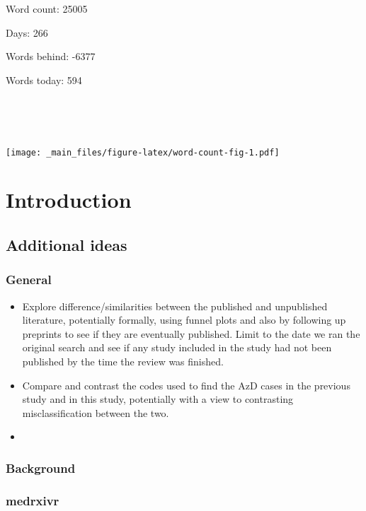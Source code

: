 \documentclass[a4paper, twoside]{templates/ociamthesis}
\begin{document}
\adjustmtc

Word count: 25005

Days: 266

Words behind: -6377

Words today: 594

~

~

\texttt{[image: \_main\_files/figure-latex/word-count-fig-1.pdf]}



\hypertarget{intro-heading}{%
\chapter{Introduction}\label{intro-heading}}

\minitoc 

\hypertarget{additional-ideas}{%
\section{Additional ideas}\label{additional-ideas}}

\hypertarget{general}{%
\subsection{General}\label{general}}

\begin{itemize}
\item
  Explore difference/similarities between the published and unpublished literature, potentially formally, using funnel plots and also by following up preprints to see if they are eventually published. Limit to the date we ran the original search and see if any study included in the study had not been published by the time the review was finished.
\item
  Compare and contrast the codes used to find the AzD cases in the previous study and in this study, potentially with a view to contrasting misclassification between the two.
\item
\end{itemize}

\hypertarget{background}{%
\subsection{Background}\label{background}}

\hypertarget{medrxivr}{%
\subsection{medrxivr}\label{medrxivr}}
\end{document}
